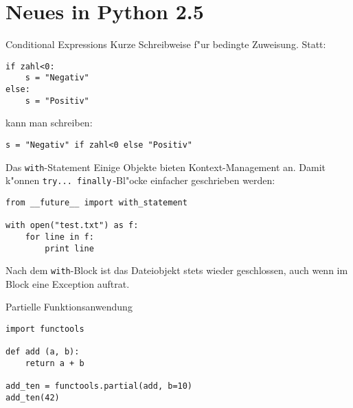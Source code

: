 \section{Neues in Python 2.5}

\begin{frame}[fragile]{Conditional Expressions}
Kurze Schreibweise f"ur bedingte Zuweisung. Statt:
\begin{lstlisting}
if zahl<0:
    s = "Negativ"
else:
    s = "Positiv"
\end{lstlisting}
kann man schreiben:
\begin{lstlisting}
s = "Negativ" if zahl<0 else "Positiv"
\end{lstlisting}
\end{frame}

\begin{frame}[fragile]{Das \texttt{with}-Statement}
Einige Objekte bieten Kontext-Management an. Damit k"onnen \lstinline{try... finally}\,-Bl"ocke einfacher geschrieben werden:
\begin{lstlisting}
from __future__ import with_statement

with open("test.txt") as f:
    for line in f:
        print line
\end{lstlisting}
Nach dem \lstinline{with}-Block ist das Dateiobjekt stets wieder geschlossen, auch wenn im Block eine Exception auftrat.
\end{frame}

\begin{frame}[fragile]{Partielle Funktionsanwendung}
\begin{lstlisting}
import functools

def add (a, b):
    return a + b

add_ten = functools.partial(add, b=10)
add_ten(42)
\end{lstlisting}
\end{frame}

